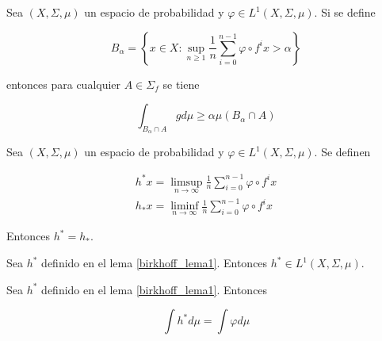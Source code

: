\begin{lema}\label{maxima_desigualdad_cor}
	Sea $(X,\Sigma,\mu)$ un espacio de probabilidad y $\varphi \in L^1(X,\Sigma,\mu)$. Si se define
	
	\begin{equation}
		B_{\alpha} = \left\{ x \in X: \sup_{n \geq 1} \frac{1}{n} \sum_{i=0}^{n-1} \varphi \circ f^i x > \alpha \right\}
	\end{equation}
	
	entonces para cualquier $A \in \Sigma_f$ se tiene
	
	\begin{equation}
		\int_{B_{\alpha} \cap A} g d\mu \geq \alpha \mu(B_{\alpha} \cap A)
	\end{equation}
\end{lema}

\begin{lema}\label{birkhoff_lema1}
	Sea $(X,\Sigma,\mu)$ un espacio de probabilidad y $\varphi \in L^1(X,\Sigma,\mu)$. Se definen
	
	\begin{gather}
		h^* x = \limsup_{n \rightarrow \infty} \frac{1}{n} \sum_{i=0}^{n-1} \varphi \circ f^i x\\
		h_* x = \liminf_{n \rightarrow \infty} \frac{1}{n} \sum_{i=0}^{n-1} \varphi \circ f^i x
	\end{gather}
	
	Entonces $h^* = h_*$.
	
\end{lema}

\begin{lema}\label{birkhoff_lema2}
	Sea $h^*$  definido en el lema \ref{birkhoff_lema1}. Entonces $h^* \in L^1(X,\Sigma,\mu)$.
\end{lema}

\begin{lema}\label{birkhoff_lema3}
	Sea $h^*$  definido en el lema \ref{birkhoff_lema1}. Entonces
	
	\begin{equation}
		\int h^* d\mu = \int \varphi d\mu
	\end{equation}
\end{lema}

